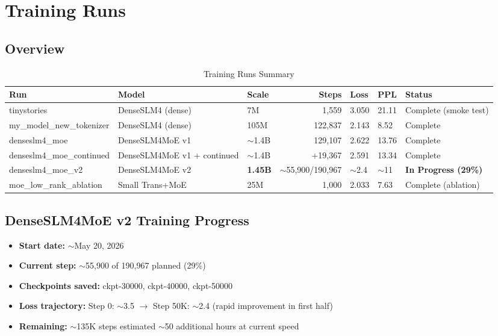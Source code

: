 \section{Training Runs}
\label{sec:experiments}

\subsection{Overview}

\begin{table}[h]
    \centering
    \caption{Training Runs Summary}
    \begin{tabular}{lllrlll}
        \toprule
        \textbf{Run} & \textbf{Model} & \textbf{Scale} & \textbf{Steps} & \textbf{Loss} & \textbf{PPL} & \textbf{Status} \\
        \midrule
        tinystories & DenseSLM4 (dense) & 7M & 1,559 & 3.050 & 21.11 & Complete (smoke test) \\
        my\_model\_new\_tokenizer & DenseSLM4 (dense) & 105M & 122,837 & 2.143 & 8.52 & Complete \\
        denseslm4\_moe & DenseSLM4MoE v1 & $\sim$1.4B & 129,107 & 2.622 & 13.76 & Complete \\
        denseslm4\_moe\_continued & DenseSLM4MoE v1 + continued & $\sim$1.4B & +19,367 & 2.591 & 13.34 & Complete \\
        denseslm4\_moe\_v2 & DenseSLM4MoE v2 & \textbf{1.45B} & $\sim$55,900/190,967 & $\sim$2.4 & $\sim$11 & \textbf{In Progress (29\%)} \\
        moe\_low\_rank\_ablation & Small Trans+MoE & 25M & 1,000 & 2.033 & 7.63 & Complete (ablation) \\
        \bottomrule
    \end{tabular}
\end{table}

\subsection{DenseSLM4MoE v2 Training Progress}

\begin{itemize}
    \item \textbf{Start date:} $\sim$May 20, 2026
    \item \textbf{Current step:} $\sim$55,900 of 190,967 planned (29\%)
    \item \textbf{Checkpoints saved:} ckpt-30000, ckpt-40000, ckpt-50000
    \item \textbf{Loss trajectory:} Step 0: $\sim$3.5 $\rightarrow$ Step 50K: $\sim$2.4 (rapid improvement in first half)
    \item \textbf{Remaining:} $\sim$135K steps estimated $\sim$50 additional hours at current speed
\end{itemize}

